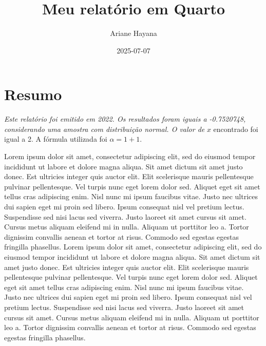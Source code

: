 \documentclass[
  a4paper,
]{report}
\title{Meu relatório em Quarto}
\author{Ariane Hayana}
\date{2025-07-07}
\renewcommand*\contentsname{Índice}
\newcommand\contentsname{Índice}
\begin{document}
\maketitle
\ifdefined\Shaded\renewenvironment{Shaded}{\begin{tcolorbox}[breakable, borderline west={3pt}{0pt}{shadecolor}, frame hidden, boxrule=0pt, interior hidden, enhanced, sharp corners]}{\end{tcolorbox}}\fi

\renewcommand*\contentsname{Índice}
{
\hypersetup{linkcolor=}
\setcounter{tocdepth}{2}
\tableofcontents
}
\listoffigures
\listoftables
\hypertarget{resumo}{%
\chapter*{Resumo}\label{resumo}}

\emph{Este relatório foi emitido em 2022. Os resultados foram iguais a
-0.7520748, considerando uma amostra com distribuição normal. O valor
de} \(x\) encontrado foi igual a 2. A fórmula utilizada foi
\(\alpha = 1+1\).

Lorem ipsum dolor sit amet, consectetur adipiscing elit, sed do eiusmod
tempor incididunt ut labore et dolore magna aliqua. Sit amet dictum sit
amet justo donec. Est ultricies integer quis auctor elit. Elit
scelerisque mauris pellentesque pulvinar pellentesque. Vel turpis nunc
eget lorem dolor sed. Aliquet eget sit amet tellus cras adipiscing enim.
Nisl nunc mi ipsum faucibus vitae. Justo nec ultrices dui sapien eget mi
proin sed libero. Ipsum consequat nisl vel pretium lectus. Suspendisse
sed nisi lacus sed viverra. Justo laoreet sit amet cursus sit amet.
Cursus metus aliquam eleifend mi in nulla. Aliquam ut porttitor leo a.
Tortor dignissim convallis aenean et tortor at risus. Commodo sed
egestas egestas fringilla phasellus. Lorem ipsum dolor sit amet,
consectetur adipiscing elit, sed do eiusmod tempor incididunt ut labore
et dolore magna aliqua. Sit amet dictum sit amet justo donec. Est
ultricies integer quis auctor elit. Elit scelerisque mauris pellentesque
pulvinar pellentesque. Vel turpis nunc eget lorem dolor sed. Aliquet
eget sit amet tellus cras adipiscing enim. Nisl nunc mi ipsum faucibus
vitae. Justo nec ultrices dui sapien eget mi proin sed libero. Ipsum
consequat nisl vel pretium lectus. Suspendisse sed nisi lacus sed
viverra. Justo laoreet sit amet cursus sit amet. Cursus metus aliquam
eleifend mi in nulla. Aliquam ut porttitor leo a. Tortor dignissim
convallis aenean et tortor at risus. Commodo sed egestas egestas
fringilla phasellus.
\end{document}
